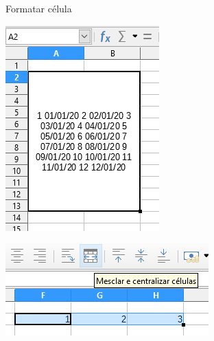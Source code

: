 \begin{frame}{Formatar célula}
	\begin{minipage}{0.49\linewidth}
		\centering
		\includegraphics[width=0.9\linewidth]{Figuras/Ch06/fig30}
	\end{minipage}\hfill
	\begin{minipage}{0.49\linewidth}
		\centering
		\includegraphics[width=1\linewidth]{Figuras/Ch06/fig31}
	\end{minipage}
\end{frame}


